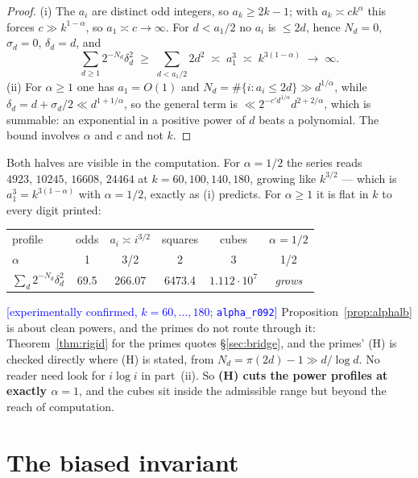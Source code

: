 \documentclass[11pt,a4paper]{article}
\theoremstyle{plain}
\theoremstyle{definition}
\theoremstyle{remark}
\newcommand{\STATUS}[1]{\textcolor{blue}{\textsf{[#1]}}}
\begin{document}
\begin{proof}
(i) The $a_i$ are distinct odd integers, so $a_k\ge2k-1$; with $a_k\asymp ck^{\alpha}$ this
forces $c\gg k^{1-\alpha}$, so $a_1\asymp c\to\infty$. For $d<a_1/2$ no $a_i$ is $\le2d$, hence
$N_d=0$, $\sigma_d=0$, $\delta_d=d$, and
\[
  \sum_{d\ge1}2^{-N_d}\delta_d^{2}\;\ge\;\sum_{d<a_1/2}2d^{2}\;\asymp\;a_1^{3}
  \;\asymp\;k^{3(1-\alpha)}\;\longrightarrow\;\infty .
\]
(ii) For $\alpha\ge1$ one has $a_1=O(1)$ and $N_d=\#\{i:a_i\le2d\}\gg d^{1/\alpha}$, while
$\delta_d=d+\sigma_d/2\ll d^{1+1/\alpha}$, so the general term is
$\ll2^{-c'd^{1/\alpha}}d^{2+2/\alpha}$, which is summable: an exponential in a positive power
of $d$ beats a polynomial. The bound involves $\alpha$ and $c$ and not $k$.
\end{proof}

\noindent
Both halves are visible in the computation. For $\alpha=1/2$ the series reads
$4923,\,10245,\,16608,\,24464$ at $k=60,100,140,180$, growing like $k^{3/2}$ --- which is
$a_1^{3}=k^{3(1-\alpha)}$ with $\alpha=1/2$, exactly as (i) predicts. For $\alpha\ge1$ it is
flat in $k$ to every digit printed:

\begin{center}
\begin{tabular}{lccccc}
\toprule
profile & odds & $a_i\asymp i^{3/2}$ & squares & cubes & $\alpha=1/2$\\
$\alpha$ & 1 & 3/2 & 2 & 3 & 1/2\\
\midrule
$\sum_d2^{-N_d}\delta_d^2$ & 69.5 & 266.07 & 6473.4 & $1.112\cdot10^{7}$ & \emph{grows}\\
\bottomrule
\end{tabular}
\end{center}

\noindent
\STATUS{experimentally confirmed, $k=60,\dots,180$; \texttt{alpha\_r092}}
Proposition~\ref{prop:alphalb} is about clean powers, and the primes do not route through it:
Theorem~\ref{thm:rigid} for the primes quotes \S\ref{sec:bridge}, and the primes'
\textup{(H)} is checked directly where \textup{(H)} is stated, from
$N_d=\pi(2d)-1\gg d/\log d$. No reader need look for $i\log i$ in part~(ii).
So \textbf{(H) cuts the power profiles at exactly $\alpha=1$}, and the cubes sit inside the
admissible range but beyond the reach of computation.

\section{The biased invariant}\label{sec:biased}
\end{document}
